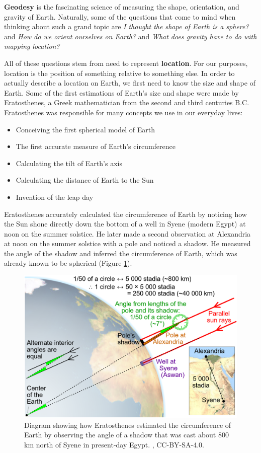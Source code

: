\documentclass[
]{book}
\providecommand{\tightlist}{%
  \setlength{\itemsep}{0pt}\setlength{\parskip}{0pt}}
\begin{document}
\textbf{Geodesy} is the fascinating science of measuring the shape, orientation, and gravity of Earth. Naturally, some of the questions that come to mind when thinking about such a grand topic are \emph{I thought the shape of Earth is a sphere?} and \emph{How do we orient ourselves on Earth?} and \emph{What does gravity have to do with mapping location?}

All of these questions stem from need to represent \textbf{location}. For our purposes, location is the position of something relative to something else. In order to actually describe a location on Earth, we first need to know the size and shape of Earth. Some of the first estimations of Earth's size and shape were made by Eratosthenes, a Greek mathematician from the second and third centuries B.C. Eratosthenes was responsible for many concepts we use in our everyday lives:

\begin{itemize}
\tightlist
\item
  Conceiving the first spherical model of Earth
\item
  The first accurate measure of Earth's circumference
\item
  Calculating the tilt of Earth's axis
\item
  Calculating the distance of Earth to the Sun
\item
  Invention of the leap day
\end{itemize}

Eratosthenes accurately calculated the circumference of Earth by noticing how the Sun shone directly down the bottom of a well in Syene (modern Egypt) at noon on the summer solstice. He later made a second observation at Alexandria at noon on the summer solstice with a pole and noticed a shadow. He measured the angle of the shadow and inferred the circumference of Earth, which was already known to be spherical (Figure \ref{fig:2-Eratosthenes}).



\begin{figure}
\includegraphics[width=0.75\linewidth]{images/02-Eratosthenes} \caption{Diagram showing how Eratosthenes estimated the circumference of Earth by observing the angle of a shadow that was cast about 800 km north of Syene in present-day Egypt. \citep{monniaux_illustration_2005}, CC-BY-SA-4.0.}\label{fig:2-Eratosthenes}
\end{figure}
\end{document}

